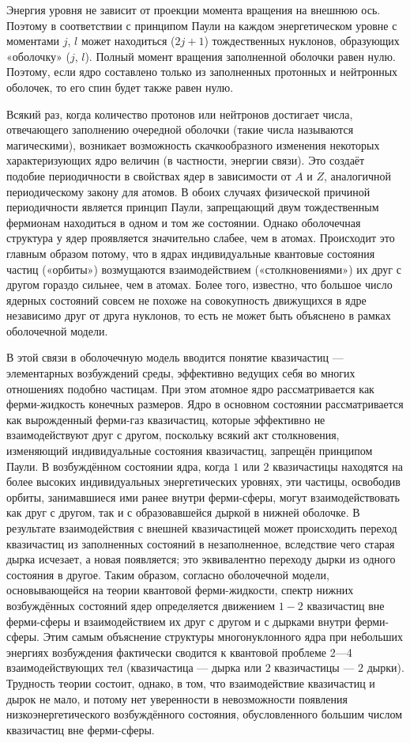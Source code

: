 \documentclass[a4paper,14pt,russian]{article}
\begin{document}
Энергия уровня не зависит от проекции момента вращения на внешнюю ось. Поэтому в соответствии с принципом Паули на каждом энергетическом уровне с моментами $j$, $l$ может находиться ($2j + 1$) тождественных нуклонов, образующих «оболочку» ($j$, $l$). Полный момент вращения заполненной оболочки равен нулю. Поэтому, если ядро составлено только из заполненных протонных и нейтронных оболочек, то его спин будет также равен нулю.

Всякий раз, когда количество протонов или нейтронов достигает числа, отвечающего заполнению очередной оболочки (такие числа называются магическими), возникает возможность скачкообразного изменения некоторых характеризующих ядро величин (в частности, энергии связи). Это создаёт подобие периодичности в свойствах ядер в зависимости от $A$ и $Z$, аналогичной периодическому закону для атомов. В обоих случаях физической причиной периодичности является принцип Паули, запрещающий двум тождественным фермионам находиться в одном и том же состоянии. Однако оболочечная структура у ядер проявляется значительно слабее, чем в атомах. Происходит это главным образом потому, что в ядрах индивидуальные квантовые состояния частиц («орбиты») возмущаются взаимодействием («столкновениями») их друг с другом гораздо сильнее, чем в атомах. Более того, известно, что большое число ядерных состояний совсем не похоже на совокупность движущихся в ядре независимо друг от друга нуклонов, то есть не может быть объяснено в рамках оболочечной модели.

В этой связи в оболочечную модель вводится понятие квазичастиц — элементарных возбуждений среды, эффективно ведущих себя во многих отношениях подобно частицам. При этом атомное ядро рассматривается как ферми-жидкость конечных размеров. Ядро в основном состоянии рассматривается как вырожденный ферми-газ квазичастиц, которые эффективно не взаимодействуют друг с другом, поскольку всякий акт столкновения, изменяющий индивидуальные состояния квазичастиц, запрещён принципом Паули. В возбуждённом состоянии ядра, когда $1$ или $2$ квазичастицы находятся на более высоких индивидуальных энергетических уровнях, эти частицы, освободив орбиты, занимавшиеся ими ранее внутри ферми-сферы, могут взаимодействовать как друг с другом, так и с образовавшейся дыркой в нижней оболочке. В результате взаимодействия с внешней квазичастицей может происходить переход квазичастиц из заполненных состояний в незаполненное, вследствие чего старая дырка исчезает, а новая появляется; это эквивалентно переходу дырки из одного состояния в другое. Таким образом, согласно оболочечной модели, основывающейся на теории квантовой ферми-жидкости, спектр нижних возбуждённых состояний ядер определяется движением $1-2$ квазичастиц вне ферми-сферы и взаимодействием их друг с другом и с дырками внутри ферми-сферы. Этим самым объяснение структуры многонуклонного ядра при небольших энергиях возбуждения фактически сводится к квантовой проблеме 2—4 взаимодействующих тел (квазичастица — дырка или $2$ квазичастицы — $2$ дырки). Трудность теории состоит, однако, в том, что взаимодействие квазичастиц и дырок не мало, и потому нет уверенности в невозможности появления низкоэнергетического возбуждённого состояния, обусловленного большим числом квазичастиц вне ферми-сферы.
\end{document}
